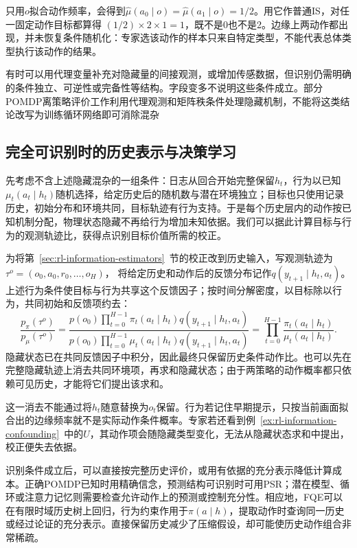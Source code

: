 只用$o$拟合动作频率，会得到$\widehat\mu(a_0\mid o)=\widehat\mu(a_1\mid o)=1/2$。用它作普通IS，对任一固定动作目标都算得
$(1/2)\times2\times1=1$，既不是0也不是2。边缘上两动作都出现，并未恢复条件随机化：专家选该动作的样本只来自特定类型，不能代表总体类型执行该动作的结果。

有时可以用代理变量补充对隐藏量的间接观测，或增加传感数据，但识别仍需明确的条件独立、可逆性或完备性等结构。字段变多不说明这些条件成立。部分POMDP离策略评价工作利用代理观测和矩阵秩条件处理隐藏机制，不能将这类结论改写为训练循环网络即可消除混杂

\subsection{完全可识别时的历史表示与决策学习}
\label{sec:rl-information-full-identification}

先考虑不含上述隐藏混杂的一组条件：日志从回合开始完整保留$h_t$，行为以已知$\mu_t(a_t\mid h_t)$随机选择，给定历史后的随机数与潜在环境独立；目标也只使用记录历史，初始分布和环境共同，目标轨迹有行为支持。于是每个历史层内的动作按已知机制分配，物理状态隐藏不再给行为增加未知依据。我们可以据此计算目标与行为的观测轨迹比，获得点识别目标价值所需的校正。

为将第~\ref{sec:rl-information-estimators}~节的校正改到历史输入，写观测轨迹为
$\tau^o=(o_0,a_0,r_0,\ldots,o_H)$，
将给定历史和动作后的反馈分布记作$q(y_{t+1}\mid h_t,a_t)$。上述行为条件使目标与行为共享这个反馈因子；按时间分解密度，以目标除以行为，共同初始和反馈项约去：
\begin{equation}
  \label{eq:rl-information-history-is}
  \frac{p_\pi(\tau^o)}{p_\mu(\tau^o)}
   =\frac{p(o_0)\prod_{t=0}^{H-1}
                  \pi_t(a_t\mid h_t)q(y_{t+1}\mid h_t,a_t)}
          {p(o_0)\prod_{t=0}^{H-1}
                  \mu_t(a_t\mid h_t)q(y_{t+1}\mid h_t,a_t)}
   =\prod_{t=0}^{H-1}\frac{\pi_t(a_t\mid h_t)}
                              {\mu_t(a_t\mid h_t)}.
\end{equation}
隐藏状态已在共同反馈因子中积分，因此最终只保留历史条件动作比。也可以先在完整隐藏轨迹上消去共同环境项，再求和隐藏状态；由于两策略的动作概率都只依赖可见历史，才能将它们提出该求和。

这一消去不能通过将$h_t$随意替换为$o_t$保留。行为若记住早期提示，只按当前画面拟合出的边缘频率就不是实际动作条件概率。专家若还看到例~\ref{ex:rl-information-confounding}~中的$U$，其动作项会随隐藏类型变化，无法从隐藏状态求和中提出，校正便失去依据。

识别条件成立后，可以直接按完整历史评价，或用有依据的充分表示降低计算成本。正确POMDP已知时用精确信念，预测结构可识别时可用PSR；潜在模型、循环或注意力记忆则需要检查允许动作上的预测或控制充分性。相应地，FQE可以在有限时域历史树上回归，行为约束作用于$\pi(a\mid h)$，提取动作时查询同一历史或经过论证的充分表示。直接保留历史减少了压缩假设，却可能使历史动作组合非常稀疏。


